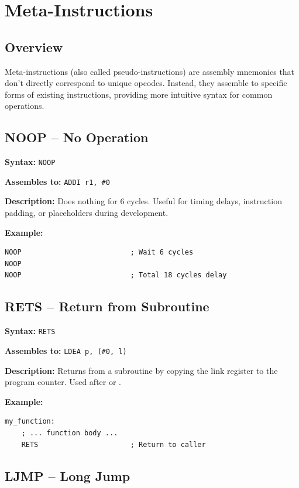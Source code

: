 \chapter{Meta-Instructions}
\label{ch:meta-instructions}

\section{Overview}

Meta-instructions (also called pseudo-instructions) are assembly mnemonics that don't directly correspond to unique
opcodes. Instead, they assemble to specific forms of existing instructions, providing more intuitive syntax for common
operations.

\section{NOOP -- No Operation}

\textbf{Syntax:} \texttt{NOOP}

\textbf{Assembles to:} \texttt{ADDI r1, \#0}

\textbf{Description:} Does nothing for 6 cycles. Useful for timing delays, instruction padding, or placeholders during development.

\textbf{Example:}
\begin{lstlisting}
NOOP                          ; Wait 6 cycles
NOOP
NOOP                          ; Total 18 cycles delay
\end{lstlisting}

\section{RETS -- Return from Subroutine}

\textbf{Syntax:} \texttt{RETS}

\textbf{Assembles to:} \texttt{LDEA p, (\#0, l)}

\textbf{Description:} Returns from a subroutine by copying the link register to the program counter. Used after  or .

\textbf{Example:}
\begin{lstlisting}
my_function:
    ; ... function body ...
    RETS                      ; Return to caller
\end{lstlisting}

\section{LJMP -- Long Jump}

